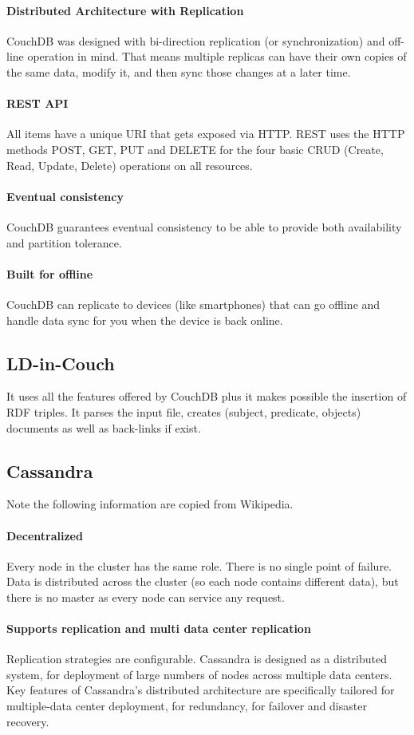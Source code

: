 \documentclass[a4paper,10pt]{article}
\begin{document}
\paragraph{Distributed Architecture with Replication}
CouchDB was designed with bi-direction replication (or synchronization) and off-line operation in mind. That means multiple replicas can have their own 
copies of the same data, modify it, and then sync those changes at a later time.
\paragraph{REST API}
All items have a unique URI that gets exposed via HTTP. REST uses the HTTP methods POST, GET, PUT and DELETE for the four basic CRUD (Create, Read, 
Update, Delete) operations on all resources.
\paragraph{Eventual consistency}
CouchDB guarantees eventual consistency to be able to provide both availability and partition tolerance.
\paragraph{Built for offline}
CouchDB can replicate to devices (like smartphones) that can go offline and handle data sync for you when the device is back online.

\subsection{LD-in-Couch}
It uses all the features offered by CouchDB plus it makes possible the insertion of RDF triples. It parses the input file, creates (subject, predicate, 
objects) documents as well as back-links if exist. 

\subsection{Cassandra}
Note the following information are copied from Wikipedia.
\paragraph{Decentralized}
Every node in the cluster has the same role. There is no single point of failure. Data is distributed across the cluster (so each node contains different data), 
but there is no master as every node can service any request.
\paragraph{Supports replication and multi data center replication}
Replication strategies are configurable. Cassandra is designed as a distributed system, for deployment of large numbers of nodes across multiple data centers. 
Key features of Cassandra’s distributed architecture are specifically tailored for multiple-data center deployment, for redundancy, for failover and disaster recovery.
\end{document}
